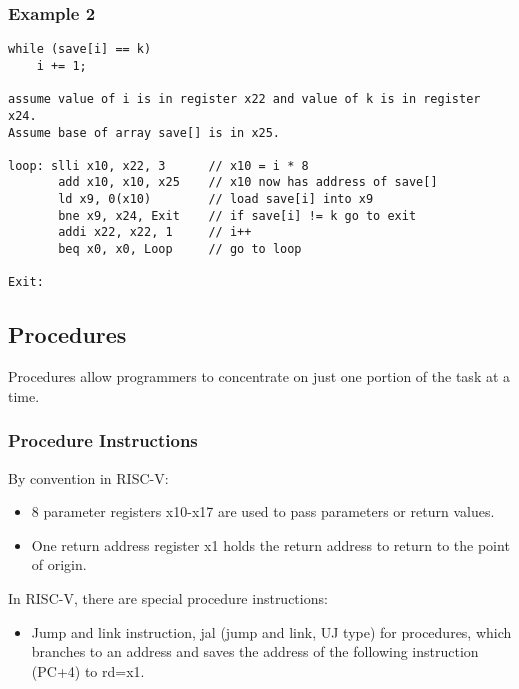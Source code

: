 \documentclass{article}
\begin{document}
\subsubsection{Example 2}
\begin{verbatim}
while (save[i] == k)
    i += 1;

assume value of i is in register x22 and value of k is in register x24.
Assume base of array save[] is in x25.

loop: slli x10, x22, 3      // x10 = i * 8
       add x10, x10, x25    // x10 now has address of save[]
       ld x9, 0(x10)        // load save[i] into x9
       bne x9, x24, Exit    // if save[i] != k go to exit
       addi x22, x22, 1     // i++
       beq x0, x0, Loop     // go to loop

Exit:
\end{verbatim}

\subsection{Procedures}
Procedures allow programmers to concentrate on just one portion of the task at a time.

\subsubsection{Procedure Instructions}
By convention in RISC-V:
\begin{itemize}
    \item 8 parameter registers x10-x17 are used to pass parameters or return values.
    \item One return address register x1 holds the return address to return to the point of origin.
\end{itemize}

In RISC-V, there are special procedure instructions:
\begin{itemize}
    \item Jump and link instruction, jal (jump and link, UJ type) for procedures, which branches to an address and saves the address of the following instruction (PC+4) to rd=x1.
\end{itemize}
\end{document}
